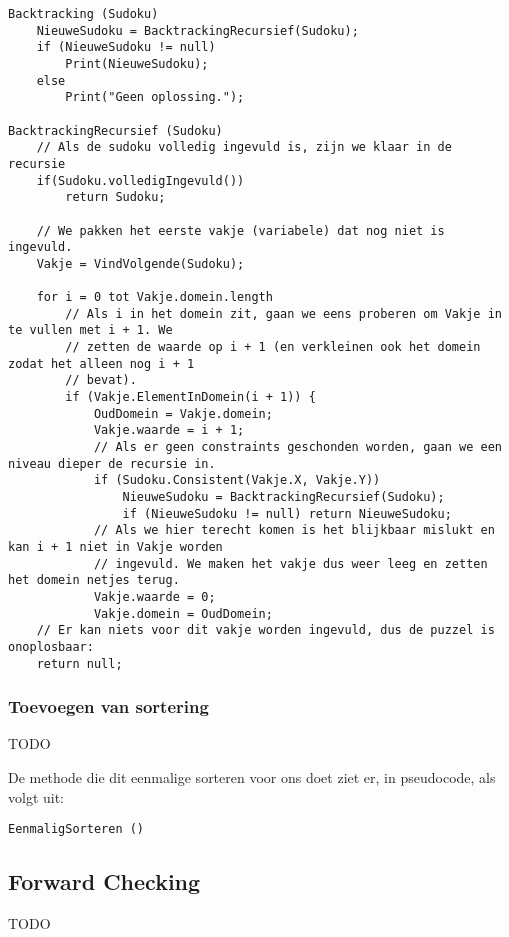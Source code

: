 \documentclass[]{report}
\begin{document}
\begin{minipage}{\textwidth}
\begin{lstlisting}
Backtracking (Sudoku)
	NieuweSudoku = BacktrackingRecursief(Sudoku);
	if (NieuweSudoku != null)
		Print(NieuweSudoku);
	else
		Print("Geen oplossing.");

BacktrackingRecursief (Sudoku)
	// Als de sudoku volledig ingevuld is, zijn we klaar in de recursie
	if(Sudoku.volledigIngevuld())
		return Sudoku;
	
	// We pakken het eerste vakje (variabele) dat nog niet is ingevuld.	
	Vakje = VindVolgende(Sudoku);
	
	for i = 0 tot Vakje.domein.length
		// Als i in het domein zit, gaan we eens proberen om Vakje in te vullen met i + 1. We 
		// zetten de waarde op i + 1 (en verkleinen ook het domein zodat het alleen nog i + 1
		// bevat).
		if (Vakje.ElementInDomein(i + 1)) {
			OudDomein = Vakje.domein;
			Vakje.waarde = i + 1;
			// Als er geen constraints geschonden worden, gaan we een niveau dieper de recursie in.
			if (Sudoku.Consistent(Vakje.X, Vakje.Y))
				NieuweSudoku = BacktrackingRecursief(Sudoku);
				if (NieuweSudoku != null) return NieuweSudoku;
			// Als we hier terecht komen is het blijkbaar mislukt en kan i + 1 niet in Vakje worden 
			// ingevuld. We maken het vakje dus weer leeg en zetten het domein netjes terug. 
			Vakje.waarde = 0;
			Vakje.domein = OudDomein;
	// Er kan niets voor dit vakje worden ingevuld, dus de puzzel is onoplosbaar:
	return null;
\end{lstlisting}
\end{minipage}

\subsubsection{Toevoegen van sortering}
TODO

De methode die dit eenmalige sorteren voor ons doet ziet er, in pseudocode, als volgt uit:

\begin{minipage}{\textwidth}
\begin{lstlisting}
EenmaligSorteren ()
\end{lstlisting}
\end{minipage}

\subsection{Forward Checking}
TODO

\begin{minipage}{\textwidth}
\begin{lstlisting}
\end{lstlisting}
\end{minipage}
\end{document}
